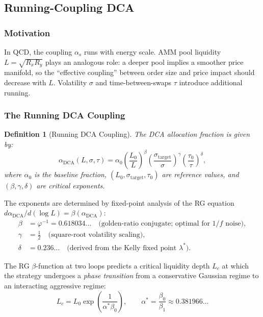 \documentclass[12pt,a4paper]{article}
\newtheorem{definition}[theorem]{Definition}
\begin{document}
\subsection{Running-Coupling DCA}
\label{sec:rg-dca}

\subsubsection{Motivation}

In QCD, the coupling $\alpha_s$ runs with energy scale.  AMM pool liquidity
$L = \sqrt{R_x R_y}$ plays an analogous role: a deeper pool implies a smoother
price manifold, so the ``effective coupling'' between order size and price
impact should decrease with $L$.  Volatility $\sigma$ and time-between-swaps
$\tau$ introduce additional running.

\subsubsection{The Running DCA Coupling}

\begin{definition}[Running DCA Coupling]
\label{def:rg-coupling}
The DCA allocation fraction is given by:
\begin{equation}
\alpha_\mathrm{DCA}(L, \sigma, \tau) = \alpha_0
    \left(\frac{L_0}{L}\right)^{\!\beta}
    \left(\frac{\sigma_\mathrm{target}}{\sigma}\right)^{\!\gamma}
    \left(\frac{\tau_0}{\tau}\right)^{\!\delta},
\label{eq:rg-coupling}
\end{equation}
where $\alpha_0$ is the baseline fraction, $(L_0, \sigma_\mathrm{target}, \tau_0)$
are reference values, and $(\beta, \gamma, \delta)$ are critical exponents.
\end{definition}

The exponents are determined by fixed-point analysis of the RG equation
$d\alpha_\mathrm{DCA}/d(\log L) = \beta(\alpha_\mathrm{DCA})$:
\begin{align}
\beta &= \varphi^{-1} = 0.618034\ldots \quad \text{(golden-ratio conjugate; optimal for $1/f$ noise)}, \label{eq:beta}\\
\gamma &= \tfrac{1}{2} \quad \text{(square-root volatility scaling)}, \label{eq:gamma}\\
\delta &= 0.236\ldots \quad \text{(derived from the Kelly fixed point $\lambda^*$)}. \label{eq:delta}
\end{align}

The RG $\beta$-function at two loops predicts a critical liquidity depth
$L_c$ at which the strategy undergoes a \emph{phase transition} from a
conservative Gaussian regime to an interacting aggressive regime:
\begin{equation}
L_c = L_0 \exp\!\left(\frac{1}{\alpha^* \beta_0}\right),\qquad
\alpha^* = \frac{\beta_0}{\beta_1} \approx 0.381966\ldots
\end{equation}
\end{document}
